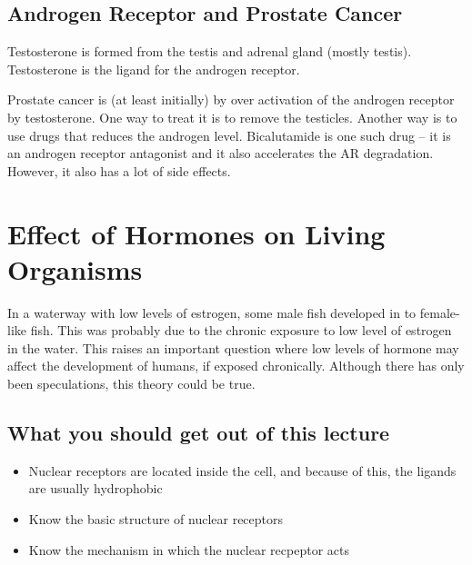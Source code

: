\subsection{Androgen Receptor and Prostate Cancer}

Testosterone is formed from the testis and adrenal gland (mostly testis).
Testosterone is the ligand for the androgen receptor.

Prostate cancer is (at least initially) by over activation of the androgen receptor by testosterone.
One way to treat it is to remove the testicles.
Another way is to use drugs that reduces the androgen level.
Bicalutamide is one such drug -- it is an androgen receptor antagonist and it also accelerates the AR degradation.
However, it also has a lot of side effects.

\section{Effect of Hormones on Living Organisms}

In a waterway with low levels of estrogen, some male fish developed in to female-like fish.
This was probably due to the chronic exposure to low level of estrogen in the water.
This raises an important question where low levels of hormone may affect the development of humans, if exposed chronically.
Although there has only been speculations, this theory could be true.

\subsection*{What you should get out of this lecture}

\begin{itemize}
	\item Nuclear receptors are located inside the cell, and because of this, the ligands are usually hydrophobic
	\item Know the basic structure of nuclear receptors
	\item Know the mechanism in which the nuclear recpeptor acts
\end{itemize}

